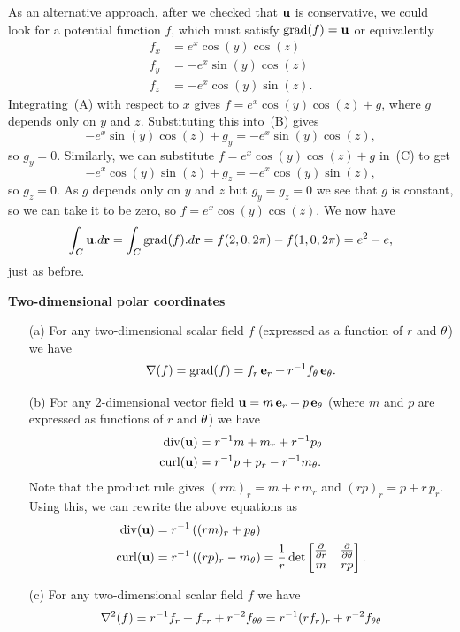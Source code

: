 \documentclass[a4paper]{amsart}
\renewenvironment{solution}{\SolutionInline}{\endSolutionInline}
\begin{document}
\begin{solution}
 As an alternative approach, after we checked that $\mathbf{u}$ is
 conservative, we could look for a potential function $f$, which must
 satisfy $\operatorname{grad}(f)=\mathbf{u}$ or equivalently 
 \begin{align*}
  f_x &= e^x \cos(y) \cos(z) \tag{A} \\
  f_y &= -e^x \sin(y) \cos(z) \tag{B} \\
  f_z &= -e^x \cos(y) \sin(z). \tag{C}
 \end{align*}
 Integrating~(A) with respect to $x$ gives $f=e^x\cos(y)\cos(z)+g$,
 where $g$ depends only on $y$ and $z$.  Substituting this into~(B)
 gives 
 \[ -e^x\sin(y)\cos(z) + g_y = -e^x\sin(y)\cos(z), \]
 so $g_y=0$.  Similarly, we can substitute $f=e^x\cos(y)\cos(z)+g$
 in~(C) to get 
 \[ -e^x\cos(y)\sin(z) + g_z = -e^x\cos(y)\sin(z), \]
 so $g_z=0$.  As $g$ depends only on $y$ and $z$ but $g_y=g_z=0$ we
 see that $g$ is constant, so we can take it to be zero, so
 $f=e^x\cos(y)\cos(z)$.  We now have
 \[ \int_C\mathbf{u}.d\mathbf{r} = \int_C\operatorname{grad}(f).d\mathbf{r} = 
     f(2,0,2\pi) - f(1,0,2\pi) =
      e^2 - e,
 \]
 just as before.
\end{solution}


\newpage

\begin{center}
 \Large \textbf{Two-dimensional polar coordinates}
\end{center}

 \begin{itemize}
  \item[(a)] For any two-dimensional scalar field $f$ (expressed as a
   function of $r$ and $\theta$) we have 
   \[ \nabla(f) = \operatorname{grad}(f) = f_r\,\mathbf{e}_r + r^{-1}f_\theta\,\mathbf{e}_\theta. \]
  \item[(b)] For any $2$-dimensional vector field
   $\mathbf{u}=m\,\mathbf{e}_r+p\,\mathbf{e}_\theta$ (where $m$ and $p$ are expressed as
   functions of $r$ and $\theta$) we have 
   \begin{align*}
    \operatorname{div}(\mathbf{u}) &= r^{-1}m + m_r + r^{-1}p_\theta \\
    \operatorname{curl}(\mathbf{u}) &= r^{-1}p + p_r - r^{-1}m_\theta.
   \end{align*}
   Note that the product rule gives $(rm)_r=m+r\,m_r$ and
   $(rp)_r=p+r\,p_r$.  Using this, we can rewrite the above equations
   as 
   \begin{align*}
    \operatorname{div}(\mathbf{u}) &= r^{-1}\left((rm)_r + p_\theta \right) \\
    \operatorname{curl}(\mathbf{u}) &= r^{-1}\left((rp)_r - m_\theta \right) 
      = \frac{1}{r} \det\left[\begin{matrix} \frac{\partial}{\partial r} & \frac{\partial}{\partial\theta} \\ m & rp \end{matrix}\right].
   \end{align*}
  \item[(c)] For any two-dimensional scalar field $f$ we have 
   \[ \nabla^2(f) = r^{-1}f_r + f_{rr} + r^{-2}f_{\theta\theta} 
        = r^{-1}(rf_r)_r + r^{-2}f_{\theta\theta} 
   \]
 \end{itemize}
\end{document}
